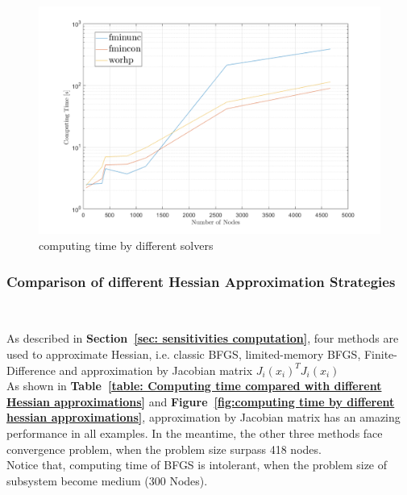 \documentclass{article}
\begin{document}
\begin{figure}[hbt!]
 \begin{center}
    \includegraphics[width=1\textwidth]{Simulation_Results/computing_time_diff_solvers.pdf}
    \caption{computing time by different solvers}
    \label{fig:computing time by different solvers}
 \end{center}
\end{figure}
\clearpage

\subsubsection{Comparison of different Hessian Approximation Strategies}~\label{sec: different hessian approximations}

As described in \textbf{Section~\ref{sec: sensitivities computation}}, four methods are used to approximate Hessian, i.e. classic BFGS, limited-memory BFGS, Finite-Difference and approximation by Jacobian matrix $J_i(x_i)^T J_i(x_i)$ \\

As shown in \textbf{Table~\ref{table: Computing time compared with different Hessian approximations}} and \textbf{Figure~\ref{fig:computing time by different hessian approximations}}, approximation by Jacobian matrix has an amazing performance in all examples. In the meantime, the other three methods face convergence problem, when the problem size surpass 418 nodes. \\

Notice that, computing time of BFGS is intolerant, when the problem size of subsystem become medium (300 Nodes). 
\end{document}
